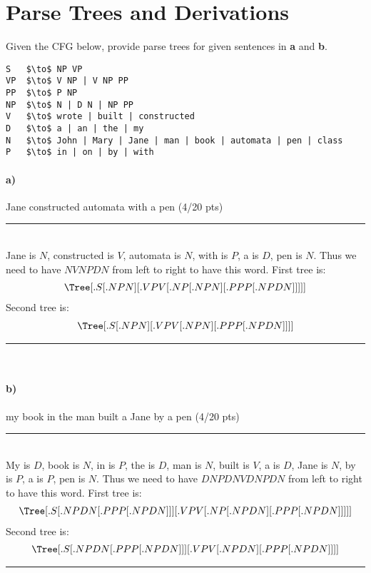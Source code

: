 \documentclass[a4paper,12pt]{article}
\newcommand{\HRule}{\rule{\linewidth}{1mm}}
\begin{document}
\newpage
\section{Parse Trees and Derivations \hfill {}}
Given the CFG below, provide parse trees for given sentences in \textbf{a} and \textbf{b}.\\

\begin{lstlisting}[style=output,mathescape=true]
S   $\to$ NP VP
VP  $\to$ V NP | V NP PP
PP  $\to$ P NP
NP  $\to$ N | D N | NP PP
V   $\to$ wrote | built | constructed
D   $\to$ a | an | the | my
N   $\to$ John | Mary | Jane | man | book | automata | pen | class
P   $\to$ in | on | by | with
\end{lstlisting}

\paragraph{a)} Jane constructed automata with a pen \hfill \small{(4/20 pts)} \\

\HRule\\
Jane is $N$, constructed is $V$, automata is $N$, with is $P$, a is $D$, pen is $N$. Thus we need to have $NVNPDN$ from left to right to have this word.
First tree is:
\begin{align*}
\Tree [.S [.NP N ] [.VP V [.NP [.NP N ] [.PP P [.NP D N ] ] ] ] ] \\
\end{align*}
Second tree is:
\begin{align*}
\Tree [.S [.NP N ] [.VP V [.NP N ] [.PP P [.NP D N ] ] ] ] \\
\end{align*}
\HRule\\

\paragraph{b)} my book in the man built a Jane by a pen \hfill \small{(4/20 pts)} \\

\HRule\\
My is $D$, book is $N$, in is $P$, the is $D$, man is $N$, built is $V$, a is $D$, Jane is $N$, by is $P$, a is $P$, pen is $N$. Thus we need to have $DNPDNVDNPDN$ from left to right to have this word.
First tree is:
\begin{align*}
\Tree [.S [.NP D N [.PP P [.NP D N ] ] ] [.VP V [.NP [.NP D N ] [.PP P [.NP D N ] ] ]] ]\\
\end{align*}
Second tree is:
\begin{align*}
\Tree [.S [.NP D N [.PP P [.NP D N ] ] ] [.VP V [.NP D N ] [.PP P [.NP D N ] ] ] ] \\
\end{align*}
\HRule\\
\end{document}
